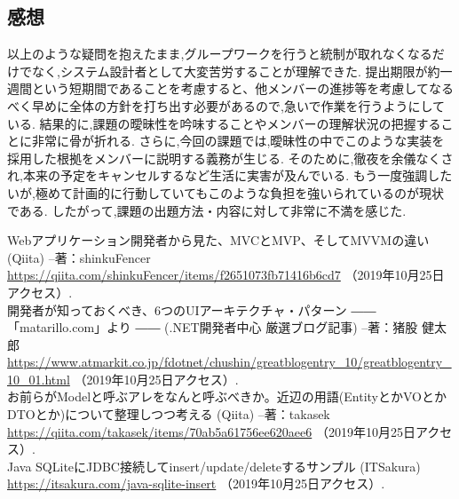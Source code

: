 \documentclass[uplatex,12pt]{jsarticle}
\begin{document}
\subsection{感想}
以上のような疑問を抱えたまま,グループワークを行うと統制が取れなくなるだけでなく,システム設計者として大変苦労することが理解できた.
提出期限が約一週間という短期間であることを考慮すると、他メンバーの進捗等を考慮してなるべく早めに全体の方針を打ち出す必要があるので,急いで作業を行うようにしている.
結果的に,課題の曖昧性を吟味することやメンバーの理解状況の把握することに非常に骨が折れる.
さらに,今回の課題では,曖昧性の中でこのような実装を採用した根拠をメンバーに説明する義務が生じる.
そのために,徹夜を余儀なくされ,本来の予定をキャンセルするなど生活に実害が及んでいる.
もう一度強調したいが,極めて計画的に行動していてもこのような負担を強いられているのが現状である.
したがって,課題の出題方法・内容に対して非常に不満を感じた.



\begin{thebibliography}{99}
 Webアプリケーション開発者から見た、MVCとMVP、そしてMVVMの違い (Qiita) --著：shinkuFencer \\
\url{https://qiita.com/shinkuFencer/items/f2651073fb71416b6cd7} （2019年10月25日アクセス）. \\
 開発者が知っておくべき、6つのUIアーキテクチャ・パターン ―― 「matarillo.com」より ―― (.NET開発者中心 厳選ブログ記事) --著：猪股 健太郎 \\
\url{https://www.atmarkit.co.jp/fdotnet/chushin/greatblogentry_10/greatblogentry_10_01.html} （2019年10月25日アクセス）. \\
 お前らがModelと呼ぶアレをなんと呼ぶべきか。近辺の用語(EntityとかVOとかDTOとか)について整理しつつ考える (Qiita) --著：takasek \\
\url{https://qiita.com/takasek/items/70ab5a61756ee620aee6} （2019年10月25日アクセス）. \\
 Java SQLiteにJDBC接続してinsert/update/deleteするサンプル (ITSakura) \\
\url{https://itsakura.com/java-sqlite-insert} （2019年10月25日アクセス）. \\
\end{thebibliography}
\end{document}
